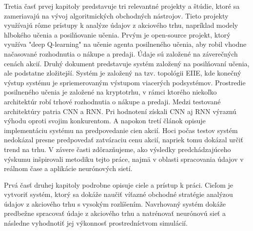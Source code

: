 \documentclass[a4paper,oneside,onecolumn,12pt]{book}
\begin{document}
Tretia časť prvej kapitoly predstavuje tri relevantné projekty a štúdie, ktoré sa zameriavajú na vývoj algoritmických obchodných nástrojov. Tieto projekty využívajú rôzne prístupy k analýze údajov z akciového trhu, napríklad modely hlbokého učenia a posilňovanie učenia. Prvým je open-source projekt, ktorý využíva "deep Q-learning" na učenie agenta posilneného učenia, aby robil vhodne načasované rozhodnutia o nákupe a predaji. Údaje sú založené na záverečných cenách akcií. Druhý dokument predstavuje systém založený na posilňovaní učenia, ale podstatne zložitejší.  Systém je založený na tzv. topológii EIIE, kde konečný výstup systému je spriemerovaným výstupom viacerých podsystémov. Prostredie posilneného učenia je založené na kryptotrhu, v rámci ktorého niekoľko architektúr robí trhové rozhodnutia o nákupe a predaji. Medzi testované architektúry patria CNN a RNN. Pri hodnotení získali CNN aj RNN výraznú výhodu oproti svojim konkurentom. A napokon tretí článok opisuje implementáciu systému na predpovedanie cien akcií. Hoci počas testov systém nedokázal presne predpovedať zatváraciu cenu akcií, napriek tomu dokázal určiť trend na trhu. V závere časti zdôrazňujeme, ako výsledky predchádzajúceho výskumu inšpirovali metodiku tejto práce, najmä v oblasti spracovania údajov v reálnom čase a aplikácie neurónových sietí.

Prvá časť druhej kapitoly podrobne opisuje ciele a prístup k práci. Cieľom je vytvoriť systém, ktorý sa dokáže naučiť víťazné obchodné stratégie analýzou údajov z akciového trhu s vysokým rozlíšením. Navrhovaný systém dokáže predbežne spracovať údaje z akciového trhu a natrénovať neurónovú sieť a následne vyhodnotiť jej výkonnosť prostredníctvom simulácií.
\end{document}
